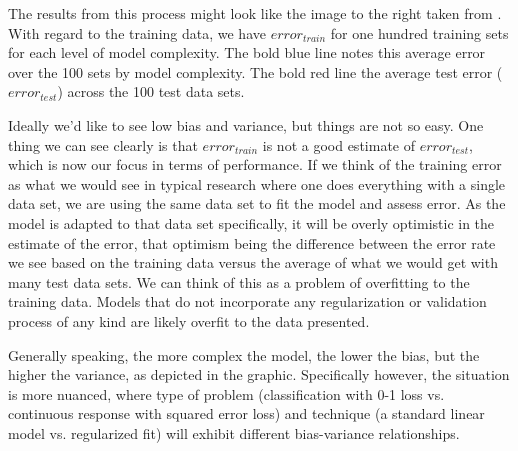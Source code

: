 \documentclass[english,nohyper,titlepage]{tufte-handout}
\begin{document}
The results from this process might look like the image to the right taken from \citet{hastie_elements_2009}.  With regard to the training data, we have $error_{train}$ for one hundred training sets for each level of model complexity.  The bold blue line notes this average error over the 100 sets by model complexity.  The bold red line the average test error ($error_{test}$) across the 100 test data sets.

Ideally we'd like to see low bias and variance, but things are not so easy. One thing we can see clearly is that $error_{train}$ is not a good estimate of $error_{test}$, which is now our focus in terms of performance. If we think of the training error as what we would see in typical research where one does everything with a single data set, we are using the same data set to fit the model and assess error.  As the model is adapted to that data set specifically, it will be overly optimistic in the estimate of the error, that optimism being the difference between the error rate we see based on the training data versus the average of what we would get with many test data sets.  We can think of this as a problem of overfitting to the training data.  Models that do not incorporate any regularization or validation process of any kind are likely overfit to the data presented.

Generally speaking, the more complex the model, the lower the bias, but the higher the variance, as depicted in the graphic.  Specifically however, the situation is more nuanced, where type of problem (classification with 0-1 loss vs. continuous response with squared error loss) and technique (a standard linear model vs. regularized fit) will exhibit different bias-variance relationships.
\end{document}
